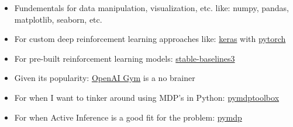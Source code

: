 \begin{itemize}
    \item Fundementals for data manipulation, visualization, etc. like: numpy, pandas, matplotlib, seaborn, etc.
    \item For custom deep reinforcement learning approaches like: \href{https://keras.io/examples/rl/}{keras} with \href{https://pytorch.org/}{pytorch}
    \item For pre-built reinforcement learning models: \href{https://stable-baselines3.readthedocs.io/en/master/}{stable-baselines3}
    \item Given its popularity: \href{https://gymnasium.farama.org/}{OpenAI Gym} is a no brainer
    \item For when I want to tinker around using MDP's in Python: \href{https://pymdptoolbox.readthedocs.io/en/latest/}{pymdptoolbox}
    \item For when Active Inference is a good fit for the problem: \href{https://github.com/infer-actively/pymdp}{pymdp}
\end{itemize}